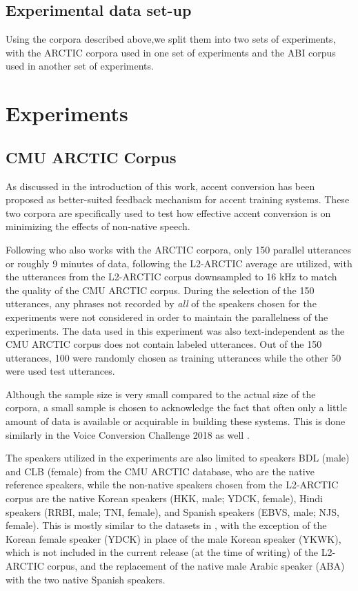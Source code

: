 \documentclass
[
    a4paper,
    twoside,
    12pt,
]
{report}
\begin{document}
\hypertarget{experimental-data-set-up}{%
\subsection{Experimental data set-up}\label{experimental-data-set-up}}

Using the corpora described above,we split them into two sets of
experiments, with the ARCTIC corpora used in one set of experiments and
the ABI corpus used in another set of experiments.

\hypertarget{experiments}{%
\section{Experiments}\label{experiments}}

\hypertarget{cmu-arctic-corpus-1}{%
\subsection{CMU ARCTIC Corpus}\label{cmu-arctic-corpus-1}}

As discussed in the introduction of this work, accent conversion has
been proposed as better-suited feedback mechanism for accent training
systems. These two corpora are specifically used to test how effective
accent conversion is on minimizing the effects of non-native speech.

Following \textcite{zhao2018a} who also works with the ARCTIC corpora,
only 150 parallel utterances or roughly 9 minutes of data, following the
L2-ARCTIC average are utilized, with the utterances from the L2-ARCTIC
corpus downsampled to 16 kHz to match the quality of the CMU ARCTIC
corpus. During the selection of the 150 utterances, any phrases not
recorded by \emph{all} of the speakers chosen for the experiments were
not considered in order to maintain the parallelness of the experiments.
The data used in this experiment was also text-independent as the CMU
ARCTIC corpus does not contain labeled utterances. Out of the 150
utterances, 100 were randomly chosen as training utterances while the
other 50 were used test utterances.

Although the sample size is very small compared to the actual size of
the corpora, a small sample is chosen to acknowledge the fact that often
only a little amount of data is available or acquirable in building
these systems. This is done similarly in the Voice Conversion Challenge
2018 as well \cite{lorenzo-trueba2018}.

The speakers utilized in the experiments are also limited to speakers
BDL (male) and CLB (female) from the CMU ARCTIC database, who are the
native reference speakers, while the non-native speakers chosen from the
L2-ARCTIC corpus are the native Korean speakers (HKK, male; YDCK,
female), Hindi speakers (RRBI, male; TNI, female), and Spanish speakers
(EBVS, male; NJS, female). This is mostly similar to the datasets in
\textcite{zhao2018a}, with the exception of the Korean female speaker
(YDCK) in place of the male Korean speaker (YKWK), which is not included
in the current release (at the time of writing) of the L2-ARCTIC corpus,
and the replacement of the native male Arabic speaker (ABA) with the two
native Spanish speakers.
\end{document}
